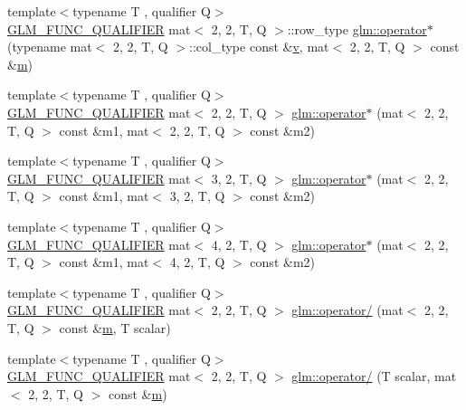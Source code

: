 \begin{DoxyCompactItemize}
\item 
{\footnotesize template$<$typename T , qualifier Q$>$ }\\\hyperlink{setup_8hpp_a33fdea6f91c5f834105f7415e2a64407}{G\+L\+M\+\_\+\+F\+U\+N\+C\+\_\+\+Q\+U\+A\+L\+I\+F\+I\+ER} mat$<$ 2, 2, T, Q $>$\+::row\+\_\+type \hyperlink{namespaceglm_a71f3cfd138e28f76eb62c264a7ea1d27}{glm\+::operator$\ast$} (typename mat$<$ 2, 2, T, Q $>$\+::col\+\_\+type const \&\hyperlink{_s_d_l__opengl_8h_a10a82eabcb59d2fcd74acee063775f90}{v}, mat$<$ 2, 2, T, Q $>$ const \&\hyperlink{_s_d_l__opengl__glext_8h_af593500c283bf1a787a6f947f503a5c2}{m})
\item 
{\footnotesize template$<$typename T , qualifier Q$>$ }\\\hyperlink{setup_8hpp_a33fdea6f91c5f834105f7415e2a64407}{G\+L\+M\+\_\+\+F\+U\+N\+C\+\_\+\+Q\+U\+A\+L\+I\+F\+I\+ER} mat$<$ 2, 2, T, Q $>$ \hyperlink{namespaceglm_a9d351b42dc8b85017ba0859097a7c7cb}{glm\+::operator$\ast$} (mat$<$ 2, 2, T, Q $>$ const \&m1, mat$<$ 2, 2, T, Q $>$ const \&m2)
\item 
{\footnotesize template$<$typename T , qualifier Q$>$ }\\\hyperlink{setup_8hpp_a33fdea6f91c5f834105f7415e2a64407}{G\+L\+M\+\_\+\+F\+U\+N\+C\+\_\+\+Q\+U\+A\+L\+I\+F\+I\+ER} mat$<$ 3, 2, T, Q $>$ \hyperlink{namespaceglm_a32a3f3f150547afbd5920c527a0646cf}{glm\+::operator$\ast$} (mat$<$ 2, 2, T, Q $>$ const \&m1, mat$<$ 3, 2, T, Q $>$ const \&m2)
\item 
{\footnotesize template$<$typename T , qualifier Q$>$ }\\\hyperlink{setup_8hpp_a33fdea6f91c5f834105f7415e2a64407}{G\+L\+M\+\_\+\+F\+U\+N\+C\+\_\+\+Q\+U\+A\+L\+I\+F\+I\+ER} mat$<$ 4, 2, T, Q $>$ \hyperlink{namespaceglm_a40f4b250002244ef41c9b4b30090eeb0}{glm\+::operator$\ast$} (mat$<$ 2, 2, T, Q $>$ const \&m1, mat$<$ 4, 2, T, Q $>$ const \&m2)
\item 
{\footnotesize template$<$typename T , qualifier Q$>$ }\\\hyperlink{setup_8hpp_a33fdea6f91c5f834105f7415e2a64407}{G\+L\+M\+\_\+\+F\+U\+N\+C\+\_\+\+Q\+U\+A\+L\+I\+F\+I\+ER} mat$<$ 2, 2, T, Q $>$ \hyperlink{namespaceglm_a604ec21846ec7d5a3335c4858f91b1e8}{glm\+::operator/} (mat$<$ 2, 2, T, Q $>$ const \&\hyperlink{_s_d_l__opengl__glext_8h_af593500c283bf1a787a6f947f503a5c2}{m}, T scalar)
\item 
{\footnotesize template$<$typename T , qualifier Q$>$ }\\\hyperlink{setup_8hpp_a33fdea6f91c5f834105f7415e2a64407}{G\+L\+M\+\_\+\+F\+U\+N\+C\+\_\+\+Q\+U\+A\+L\+I\+F\+I\+ER} mat$<$ 2, 2, T, Q $>$ \hyperlink{namespaceglm_af94f7fcc9299aa7f2cbbcac8b4b251f5}{glm\+::operator/} (T scalar, mat$<$ 2, 2, T, Q $>$ const \&\hyperlink{_s_d_l__opengl__glext_8h_af593500c283bf1a787a6f947f503a5c2}{m})

\end{DoxyCompactItemize}
